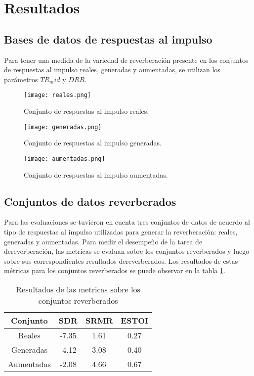 \section{Resultados}

\subsection{Bases de datos de respuestas al impulso}
Para tener una medida de la variedad de reverberación presente en los conjuntos de respuestas al impulso reales, generadas y aumentadas, se utilizan los parámetros $TR_mid$ y $DRR$. 

\begin{figure}[H]
	\centering{}
	\texttt{[image: reales.png]}
	\caption{Conjunto de respuestas al impulso reales.}
	\label{fig:reales}
\end{figure}

\begin{figure}[H]
	\centering{}
	\texttt{[image: generadas.png]}
	\caption{Conjunto de respuestas al impulso generadas.}
	\label{fig:generadas}
\end{figure}

\begin{figure}[H]
	\centering{}
	\texttt{[image: aumentadas.png]}
	\caption{Conjunto de respuestas al impulso aumentadas.}
	\label{fig:aumentas}
\end{figure}



\subsection{Conjuntos de datos reverberados}

Para las evaluaciones se tuvieron en cuenta tres conjuntos de datos de acuerdo al tipo de respuestas al impulso utilizadas para generar la reverberación: reales, generadas y aumentadas. Para medir el desempeño de la tarea de dereverberación, las metricas se evaluan sobre los conjuntos reverberados y luego sobre sus correspondientes resultados dereverberados. Los resultados de estas métricas para los conjuntos reverberados se puede observar en la tabla \ref{table:resultados_reverb}. 

\begin{table}[H]
\centering
\caption{Resultados de las metricas sobre los conjuntos reverberados}
\begin{tabular}{|c|c|c|c|}
\hline
Conjunto   & \textbf{SDR} & \textbf{SRMR} & \textbf{ESTOI} \\ \hline
Reales     & -7.35        & 1.61          & 0.27           \\
Generadas  & -4.12        & 3.08          & 0.40           \\
Aumentadas & -2.08        & 4.66          & 0.67           \\ \hline
\end{tabular}
\label{table:resultados_reverb}
\end{table}

